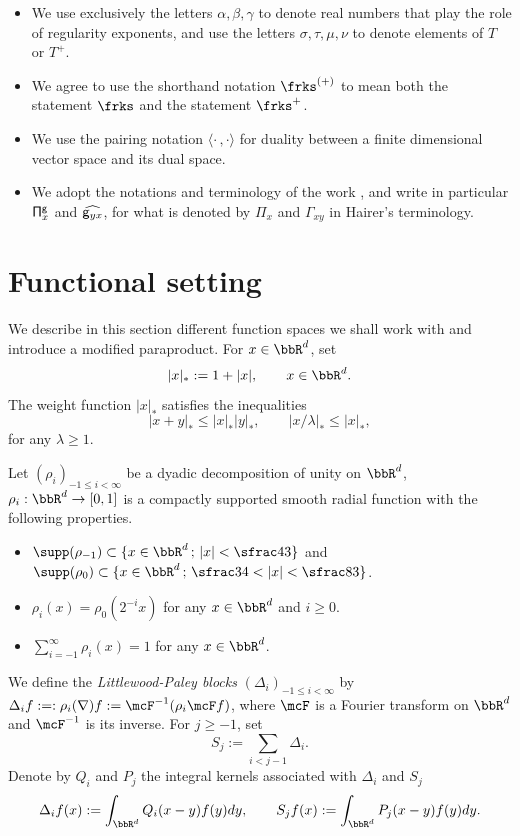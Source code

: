 \skpt
\begin{notation*}
\begin{itemize}
\item
We use exclusively the letters $\alpha, \beta, \gamma$ to denote real numbers that play the role of regularity exponents, and use the letters $\sigma, \tau, \mu, \nu$ to denote elements of $T$ or $T^+$.

\item
We agree to use the shorthand notation $\frks^{(+)}$ to mean both the statement $\frks$ and the statement $\frks^+$.

\item
We use the pairing notation $\langle \cdot\,,\cdot\rangle$ for duality between a finite dimensional vector space and its dual space.

\item
We adopt the notations and terminology of the work \cite{BH}, and write in particular ${\sf \Pi}^{\sf g}_x$ and $\widehat{{\sf g}_{yx}}$, for what is denoted by $\Pi_x$ and $\Gamma_{xy}$ in Hairer's terminology.
\end{itemize}
\end{notation*}

\section{Functional setting}
\label{SectionFunctionalSetting}

We describe in this section different function spaces we shall work with and introduce a modified paraproduct. For $x\in\bbR^d$, set\vspace*{-3pt}
\[
|x|_* := 1+|x|,\qquad x\in\bbR^d.
\]
The weight function $|x|_*$ satisfies the inequalities
\[
|x+y|_*\le|x|_*|y|_*, \qquad |x/\lambda|_*\le|x|_*,
\]
for any $\lambda\ge1$.

Let $(\rho_i)_{-1\leq i<\infty}$ be a dyadic decomposition of unity on $\bbR^d$, \ie $\rho_i:\bbR^d\to[0,1]$ is a compactly supported smooth radial function with the following properties.
\begin{itemize}
\item $\supp (\rho_{-1})\subset\{x\in\bbR^d\,;\,|x|<\sfrac43\}$ and $\supp (\rho_0)\subset\{x\in\bbR^d\,;\,\sfrac34<|x|<\sfrac83\}$.
\item $\rho_i(x)=\rho_0(2^{-i}x)$ for any $x\in\bbR^d$ and $i\ge0$.
\item $\sum_{i=-1}^\infty\rho_i(x)=1$ for any $x\in\bbR^d$.
\end{itemize}
We define the \emph{Littlewood-Paley blocks} $(\Delta_i)_{-1\leq i<\infty}$ by $\Delta_if :=: \rho_i(\nabla)f:= \mcF^{-1}(\rho_i\mcF f)$, where $\mcF$ is a Fourier transform on $\bbR^d$ and $\mcF^{-1}$ is its inverse. For $j\geq -1$, set
\[
S_j := \sum_{i<j-1}\Delta_i.
\]
Denote by $Q_i$ and $P_j$ the integral kernels associated with $\Delta_i$ and $S_j$
\[
\Delta_if(x) := \int_{\bbR^d} Q_i(x-y)f(y)dy, \qquad S_jf(x) := \int_{\bbR^d} P_j(x-y)f(y)dy.
\]

